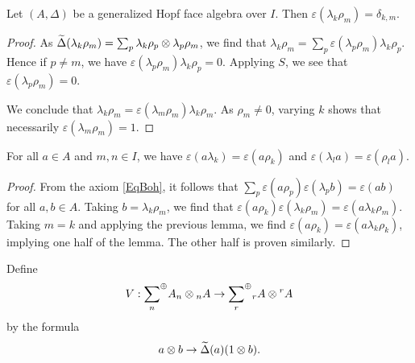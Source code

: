 
\begin{Lem} Let $(A,\Delta)$ be a generalized Hopf face algebra over
  $I$. Then $\varepsilon(\lambda_k\rho_m)=\delta_{k,m}$.
\end{Lem}
\begin{proof} As $\widetilde{\Delta}(\lambda_k\rho_m) = \sum_p
  \lambda_k\rho_p\otimes \lambda_p\rho_m$, we find that
  $\lambda_k\rho_m = \sum_p
  \varepsilon(\lambda_p\rho_m)\lambda_k\rho_p$. Hence if $p\neq m$, we
  have $\varepsilon(\lambda_p\rho_m)\lambda_k\rho_p=0$. Applying $S$,
  we see that $\varepsilon(\lambda_p\rho_m)=0$.

  We conclude that $\lambda_k\rho_m =
  \varepsilon(\lambda_m\rho_m)\lambda_k\rho_m$. As $\rho_m \neq 0$,
  varying $k$ shows that necessarily $\varepsilon(\lambda_m\rho_m)=1$.
\end{proof}


\begin{Lem} For all $a\in A$ and $m,n\in I$, we have
  $\varepsilon(a\lambda_k) = \varepsilon(a\rho_k)$ and
  $\varepsilon(\lambda_la)=\varepsilon(\rho_la)$.
\end{Lem}
\begin{proof} From the axiom \ref{EqBoh}, it follows that $\sum_p
  \varepsilon(a\rho_p)\varepsilon(\lambda_pb)= \varepsilon(ab)$ for
  all $a,b\in A$. Taking $b = \lambda_k\rho_m$, we find that
  $\varepsilon(a\rho_k)\varepsilon(\lambda_k\rho_m) =
  \varepsilon(a\lambda_k\rho_m)$. Taking $m=k$ and applying the
  previous lemma, we find
  $\varepsilon(a\rho_k)=\varepsilon(a\lambda_k\rho_k)$, implying one
  half of the lemma. The other half is proven similarly.
\end{proof}

\begin{Def} Define \[V: \underset{n}{\sum}^{\oplus} A_n\otimes {}_{n}A \rightarrow
  \underset{r}{\sum}^{\oplus} {}_rA\otimes {}^rA\] by the formula \[a\otimes b\rightarrow
  \widetilde{\Delta}(a)(1\otimes b).\]
\end{Def}


